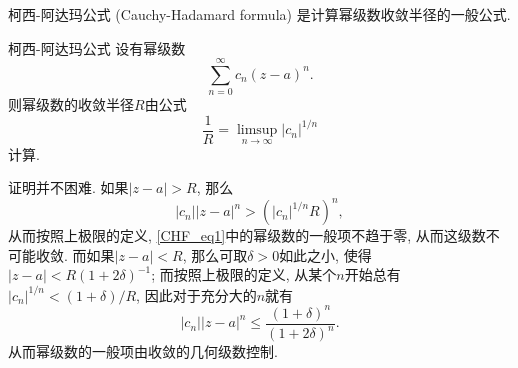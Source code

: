 
柯西-阿达玛公式 (Cauchy-Hadamard formula) 是计算幂级数收敛半径的一般公式.

\begin{theorem}{柯西-阿达玛公式}
设有幂级数
\begin{equation}\label{CHF_eq1}
\sum_{n=0}^\infty c_n(z-a)^n.
\end{equation}
则幂级数的收敛半径$R$由公式
$$
\frac{1}{R}=\limsup_{n\to\infty}|c_n|^{1/n}
$$
计算.
\end{theorem}
证明并不困难. 如果$|z-a|>R$, 那么
$$
|c_n||z-a|^n>(|c_n|^{1/n}R)^n,
$$
从而按照上极限的定义, \autoref{CHF_eq1}中的幂级数的一般项不趋于零, 从而这级数不可能收敛. 而如果$|z-a|<R$, 那么可取$\delta>0$如此之小, 使得$|z-a|<R(1+2\delta)^{-1}$; 而按照上极限的定义, 从某个$n$开始总有$|c_n|^{1/n}<(1+\delta)/R$, 因此对于充分大的$n$就有
$$
|c_n||z-a|^n\leq\frac{(1+\delta)^n}{(1+2\delta)^n}.
$$
从而幂级数的一般项由收敛的几何级数控制.